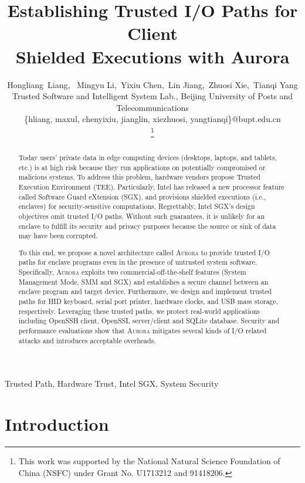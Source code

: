 \documentclass[journal,twocolumn,letterpaper,10pt]{IEEEtran}
\title{Establishing Trusted I/O Paths for Client \\ Shielded Executions with Aurora}
\author{Hongliang~Liang,~\IEEEmembership{Member,~IEEE,}
	Mingyu Li,~Yixiu Chen,~Lin Jiang,~Zhuosi Xie,~Tianqi Yang\\
	Trusted Software and Intelligent System Lab.,
	Beijing University of Posts and Telecommunications\\
	\{hliang, maxul, chenyixiu, jianglin, xiezhuosi, yangtianqi\}@bupt.edu.cn\\
    \thanks{This work was supported by the National Natural Science Foundation of China (NSFC) under Grant No. U1713212 and 91418206.}
}
\begin{document}
\maketitle

\begin{abstract}

Today users' private data in edge computing devices (desktops, laptops, and tablets, etc.) is at high risk because they run applications on potentially compromised or malicious systems. To address this problem, hardware vendors propose Trusted Execution Environment (TEE). Particularly, Intel has released a new processor feature called Software Guard eXtension (SGX), and provisions shielded executions (i.e., enclaves) for security-sensitive computations. Regrettably, Intel SGX's design objectives omit trusted I/O paths. Without such guarantees, it is unlikely for an enclave to fulfill its security and privacy purposes because the source or sink of data may have been corrupted.

To this end, we propose a novel architecture called \textsc{Aurora} to provide trusted I/O paths for enclave programs even in the presence of untrusted system software.
Specifically, \textsc{Aurora} exploits two commercial-off-the-shelf features (System Management Mode, SMM and SGX) and establishes a secure channel between an enclave program and target device.
Furthermore, we design and implement trusted paths for HID keyboard, serial port printer, hardware clocks, and USB mass storage, respectively. Leveraging these trusted paths, we protect real-world applications including OpenSSH client, OpenSSL server/client and SQLite database.
Security and performance evaluations show that \textsc{Aurora} mitigates several kinds of I/O related attacks and introduces acceptable overheads.

\end{abstract}

\begin{IEEEkeywords}

Trusted Path, Hardware Trust, Intel SGX, System Security

\end{IEEEkeywords}



\section{Introduction}
\end{document}
